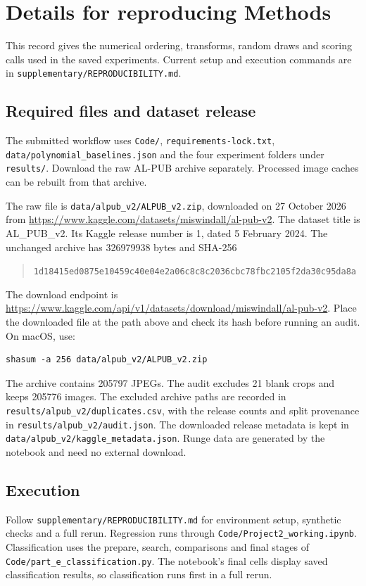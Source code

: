 \section{Details for reproducing Methods}
\label{app:methods-reproduction}
This record gives the numerical ordering, transforms, random draws and
scoring calls used in the saved experiments. Current setup and execution
commands are in \nolinkurl{supplementary/REPRODUCIBILITY.md}.

\subsection{Required files and dataset release}
The submitted workflow uses \nolinkurl{Code/}, \nolinkurl{requirements-lock.txt},
\nolinkurl{data/polynomial_baselines.json} and the four experiment folders
under \nolinkurl{results/}. Download the raw AL-PUB archive separately.
Processed image caches can be rebuilt from that archive.

The raw file is \nolinkurl{data/alpub_v2/ALPUB_v2.zip}, downloaded on
27 October 2026 from \url{https://www.kaggle.com/datasets/miswindall/al-pub-v2}.
The dataset title is AL\_PUB\_v2. Its Kaggle release number is 1, dated
5 February 2024. The unchanged archive has 326979938 bytes and SHA-256
\begin{quote}\ttfamily\small
\nolinkurl{1d18415ed0875e10459c40e04e2a06c8c8c2036cbc78fbc2105f2da30c95da8a}
\end{quote}
The download endpoint is
\url{https://www.kaggle.com/api/v1/datasets/download/miswindall/al-pub-v2}.
Place the downloaded file at the path above and check its hash before running
an audit. On macOS, use:
\begin{verbatim}
shasum -a 256 data/alpub_v2/ALPUB_v2.zip
\end{verbatim}
The archive contains 205797 JPEGs. The audit excludes 21 blank crops and
keeps 205776 images. The excluded archive paths are recorded in
\nolinkurl{results/alpub_v2/duplicates.csv}, with the release counts and
split provenance in \nolinkurl{results/alpub_v2/audit.json}. The downloaded
release metadata is kept in \nolinkurl{data/alpub_v2/kaggle_metadata.json}.
Runge data are generated by the notebook and need no external download.


\subsection{Execution}
Follow \nolinkurl{supplementary/REPRODUCIBILITY.md} for environment setup,
synthetic checks and a full rerun. Regression runs through
\nolinkurl{Code/Project2_working.ipynb}. Classification uses the prepare,
search, comparisons and final stages of
\nolinkurl{Code/part_e_classification.py}. The notebook's final cells display
saved classification results, so classification runs first in a full rerun.

